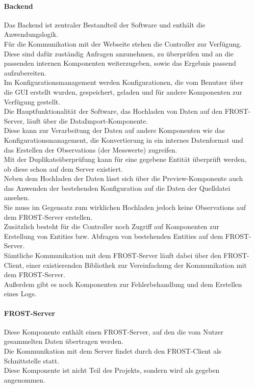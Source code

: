 \paragraph{Backend}
Das Backend ist zentraler Bestandteil der Software und enthält die Anwendungslogik.\\
Für die Kommunikation mit der Webseite stehen die Controller zur Verfügung.\\
Diese sind dafür zuständig Anfragen anzunehmen, zu überprüfen und an die passenden internen Komponenten weiterzugeben, sowie das Ergebnis passend aufzubereiten.\\

\noindent Im Konfigurationsmanagement werden Konfigurationen, die vom Benutzer über die GUI erstellt wurden, gespeichert, geladen und für andere Komponenten zur Verfügung gestellt.\\

\noindent Die Hauptfunktionalität der Software, das Hochladen von Daten auf den FROST-Server, läuft über die DataImport-Komponente.\\
Diese kann zur Verarbeitung der Daten auf andere Komponenten wie das Konfigurationsmanagement, die Konvertierung in ein internes Datenformat und das Erstellen der Observations (der Messwerte) zugreifen.\\
Mit der Duplikatsüberprüfung kann für eine gegebene Entität überprüft werden, ob diese schon auf dem Server existiert.\\
Neben dem Hochladen der Daten lässt sich über die Preview-Komponente auch das Anwenden der bestehenden Konfiguration auf die Daten der Quelldatei ansehen.\\
Sie muss im Gegensatz zum wirklichen Hochladen jedoch keine Observations auf dem FROST-Server erstellen.\\

\noindent Zusätzlich besteht für die Controller noch Zugriff auf Komponenten zur Erstellung von Entities bzw. Abfragen von bestehenden Entities auf dem FROST-Server.\\
Sämtliche Kommunikation mit dem FROST-Server läuft dabei über den FROST-Client, einer existierenden Bibliothek zur Vereinfachung der Kommunikation mit dem FROST-Server.\\
Außerdem gibt es noch Komponenten zur Fehlerbehandlung und dem Erstellen eines Logs.

\paragraph{FROST-Server}
Diese Komponente enthält einen FROST-Server, auf den die vom Nutzer gesammelten Daten übertragen werden.\\
Die Kommunikation mit dem Server findet durch den FROST-Client als Schnittstelle statt.\\
Diese Komponente ist nicht Teil des Projekts, sondern wird als gegeben angenommen.


